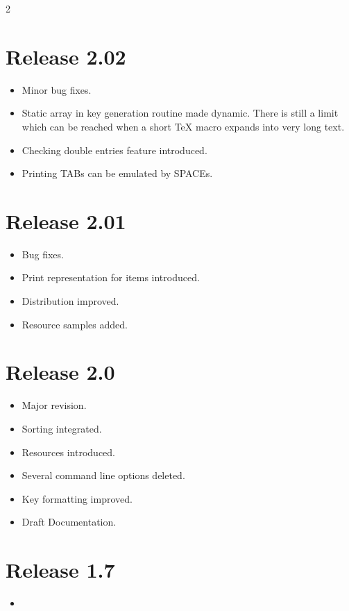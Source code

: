 \documentclass[11pt,a4paper]{scrartcl}
\newenvironment{Releases}{\begin{multicols}2\RaggedRight}{\end{multicols}}
\newenvironment{Release}[2]{%
  \def\tmp{#2}%
  \section*{Release #1 \ifx\tmp\empty\else{\normalsize[#2]}\fi}
  \begin{itemize}
}{\end{itemize}}
\newenvironment{Fix}[1]{\item }{}
\newenvironment{New}[1]{\item }{}
\newenvironment{Doc}[1]{\item }{}
\newenvironment{Update}[1]{\item }{}
\begin{document}
\begin{Releases}
 \begin{Release}{2.02}{}
  \begin{Fix}{gene}
    Minor bug fixes.
  \end{Fix}
  \begin{Update}{gene}
    Static array in key generation routine made dynamic. There is
    still a limit which can be reached when a short \TeX{} macro
    expands into very long text.
  \end{Update}
  \begin{New}{gene}
    Checking double entries feature introduced.
  \end{New}
  \begin{New}{gene}
    Printing TABs can be emulated by SPACEs.
  \end{New}
 \end{Release}

 \begin{Release}{2.01}{}
  \begin{Fix}{gene}
    Bug fixes.
  \end{Fix}
  \begin{New}{gene}
    Print representation for items introduced.
  \end{New}
  \begin{Update}{gene}
    Distribution improved.
  \end{Update}
  \begin{New}{gene}
    Resource samples added.
  \end{New}
 \end{Release}

 \begin{Release}{2.0}{}
  \begin{New}{gene}
    Major revision.
  \end{New}
  \begin{New}{gene}
    Sorting integrated.
  \end{New}
  \begin{New}{gene}
    Resources introduced.
  \end{New}
  \begin{Update}{gene}
    Several command line options deleted.
  \end{Update}
  \begin{Update}{gene}
    Key formatting improved.
  \end{Update}
  \begin{Doc}{gene}
    Draft Documentation.
  \end{Doc}
 \end{Release}

 \begin{Release}{1.7}{}
  \item[]
 \end{Release}

\end{Releases}
\end{document}
